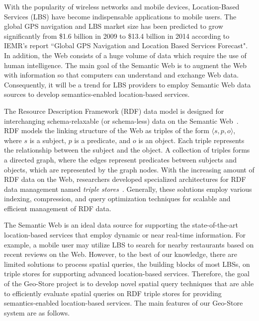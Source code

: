 
With the popularity of wireless networks and mobile devices,
Location-Based Services (LBS) have become indispensable
applications to mobile users. The global GPS navigation and LBS
market size has been predicted to grow significantly from \$1.6
billion in 2009 to \$13.4 billion in 2014 according to IEMR's
report ``Global GPS Navigation and Location Based Services
Forecast". In addition, the Web consists of a huge volume of data
which require the use of human intelligence. The main goal of the
Semantic Web is to augment the Web with information so that
computers can understand and exchange Web data. Consequently, it
will be a trend for LBS providers to employ Semantic Web data
sources to develop semantics-enabled location-based services.

The Resource Description Framework (RDF) data model is designed
for interchanging schema-relaxable (or schema-less) data on the
Semantic Web~\cite{RDF}. RDF models the linking structure of the
Web as triples of the form $\langle s, p, o \rangle$, where $s$ is
a subject, $p$ is a predicate, and $o$ is an object. Each triple
represents the relationship between the subject and the object. A
collection of triples forms a directed graph, where the edges
represent predicates between subjects and objects, which are
represented by the graph nodes. With the increasing amount of RDF
data on the Web, researchers developed specialized architectures
for RDF data management named \emph{triple
stores}~\cite{conf/www/CarrollDDRSW04,conf/vldb/ChongDES05,conf/vldb/AbadiMMH07,
journals/pvldb/WeissKB08,journals/vldb/NeumannW10}. Generally,
these solutions employ various indexing, compression, and query
optimization techniques for scalable and efficient management of
RDF data.

The Semantic Web is an ideal data source for supporting the
state-of-the-art location-based services that employ dynamic or
near real-time information. For example, a mobile user may utilize
LBS to search for nearby restaurants based on recent reviews on
the Web. However, to the best of our knowledge, there are limited
solutions to process spatial queries, the building blocks of most
LBSs, on triple stores for supporting advanced location-based
services. Therefore, the goal of the Geo-Store project is to
develop novel spatial query techniques that are able to
efficiently evaluate spatial queries on RDF triple stores for
providing semantics-enabled location-based services. The main
features of our Geo-Store system are as follows.

